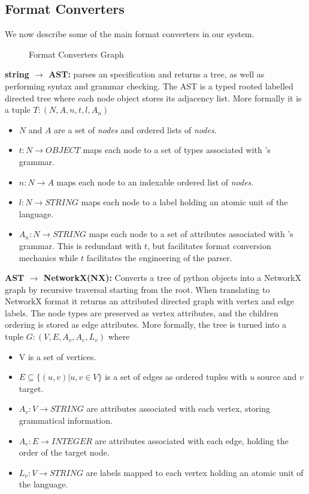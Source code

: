 \subsection{Format Converters}

We now describe some of the main format converters in our system.

\begin{figure}
\centering
  
  \caption{Format Converters Graph}
    \label{fig:FormatConverts}
\end{figure}

\textbf{\essence string $\rightarrow$ \essence AST:} parses an \essence specification and returns a tree, as well as performing syntax and grammar checking. The AST is a typed rooted labelled directed tree where each node object stores its adjacency list. More formally it is a tuple $T : (N, A, n, t, l, A_n)$
\begin{itemize}
    \item $N$ and $A$ are a set of \textit{nodes} and ordered lists of \textit{nodes}.
    \item $t : N \rightarrow OBJECT$ maps each node to a set of types associated with \essence's grammar.
    \item $n : N \rightarrow A$ maps each node to an indexable ordered list of \textit{nodes}.
    \item $l : N \rightarrow STRING$ maps each node to a label holding an atomic unit of the \essence language.
    \item $A_n : N \rightarrow STRING$ maps each node to a set of attributes associated with \essence's grammar. This is redundant with $t$, but facilitates format conversion mechanics while $t$ facilitates the engineering of the parser.
\end{itemize}

\noindent\textbf{\essence AST $\rightarrow$ NetworkX(NX):} Converts a tree of python objects into a NetworkX graph by recursive traversal starting from the root.
When translating to NetworkX format it returns an attributed directed graph with vertex and edge labels. The node types are preserved as vertex attributes, and the children ordering is stored as edge attributes. More formally, the tree is turned into a tuple $G : (V, E, A_v,A_e, L_v)$ where
\begin{itemize}
    \item V is a set of vertices.
    \item $E \subseteq \{(u,v) | u,v \in V\}$ is a set of edges as ordered tuples with $u$ source and $v$ target.
    \item $A_v : V \rightarrow STRING$ are attributes associated with each vertex, storing grammatical information.
    \item $A_e : E \rightarrow INTEGER$ are attributes associated with each edge, holding the order of the target node.
    \item $L_v : V \rightarrow STRING$ are labels mapped to each vertex holding an atomic unit of the \essence language.
\end{itemize}

